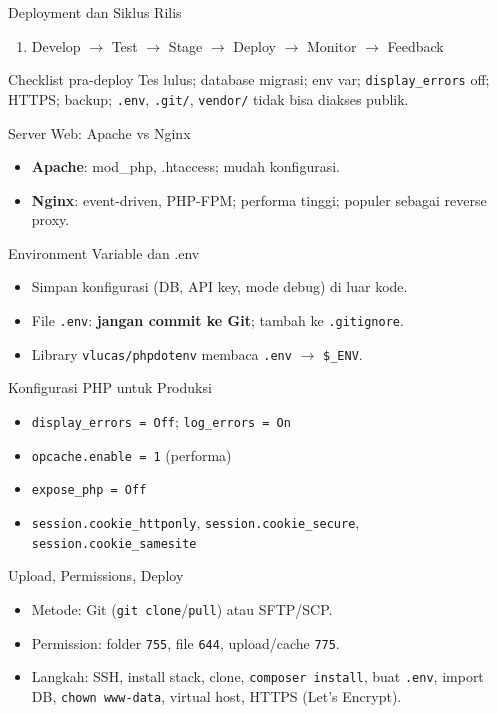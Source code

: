 \documentclass[handout]{beamer}
\begin{document}
\begin{frame}{Deployment dan Siklus Rilis}
	\begin{enumerate}
		\item Develop $\to$ Test $\to$ Stage $\to$ Deploy $\to$ Monitor $\to$ Feedback
	\end{enumerate}
	\begin{block}{Checklist pra-deploy}
		Tes lulus; database migrasi; env var; \texttt{display\_errors} off; HTTPS; backup; \texttt{.env}, \texttt{.git/}, \texttt{vendor/} tidak bisa diakses publik.
	\end{block}
\end{frame}

\begin{frame}{Server Web: Apache vs Nginx}
	\begin{itemize}
		\item \textbf{Apache}: mod\_php, .htaccess; mudah konfigurasi.
		\item \textbf{Nginx}: event-driven, PHP-FPM; performa tinggi; populer sebagai reverse proxy.
	\end{itemize}
\end{frame}

\begin{frame}{Environment Variable dan .env}
	\begin{itemize}
		\item Simpan konfigurasi (DB, API key, mode debug) di luar kode.
		\item File \texttt{.env}: \textbf{jangan commit ke Git}; tambah ke \texttt{.gitignore}.
		\item Library \texttt{vlucas/phpdotenv} membaca \texttt{.env} $\to$ \texttt{\$\_ENV}.
	\end{itemize}
\end{frame}

\begin{frame}{Konfigurasi PHP untuk Produksi}
	\begin{itemize}
		\item \texttt{display\_errors = Off}; \texttt{log\_errors = On}
		\item \texttt{opcache.enable = 1} (performa)
		\item \texttt{expose\_php = Off}
		\item \texttt{session.cookie\_httponly}, \texttt{session.cookie\_secure}, \texttt{session.cookie\_samesite}
	\end{itemize}
\end{frame}

\begin{frame}{Upload, Permissions, Deploy}
	\begin{itemize}
		\item Metode: Git (\texttt{git clone}/\texttt{pull}) atau SFTP/SCP.
		\item Permission: folder \texttt{755}, file \texttt{644}, upload/cache \texttt{775}.
		\item Langkah: SSH, install stack, clone, \texttt{composer install}, buat \texttt{.env}, import DB, \texttt{chown www-data}, virtual host, HTTPS (Let's Encrypt).
	\end{itemize}
\end{frame}
\end{document}

